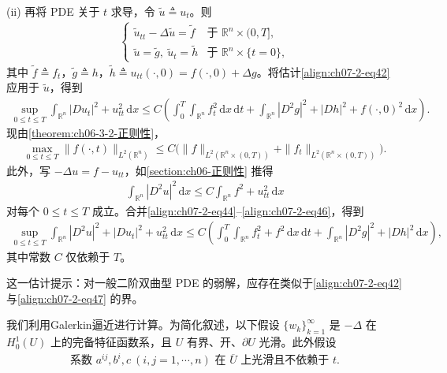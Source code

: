 \documentclass[../../main.tex]{subfiles}
\begin{document}
(ii) 再将 PDE 关于 $t$ 求导，令 $\widetilde{u}\triangleq u_t$。则
\begin{align}
\begin{cases}
\widetilde{u}_{tt}-\Delta\widetilde{u}=\widetilde{f} & \text{于 } \mathbb{R}^n\times(0,T],\\
\widetilde{u}=\widetilde{g},\ \widetilde{u}_t=\widetilde{h} & \text{于 } \mathbb{R}^n\times\{t=0\},
\end{cases}\label{align:ch07-2-eq43}
\end{align}
其中 $\widetilde{f}\triangleq f_t$，$\widetilde{g}\triangleq h$，$\widetilde{h}\triangleq u_{tt}(\cdot,0)=f(\cdot,0)+\Delta g$。将估计\eqref{align:ch07-2-eq42} 应用于 $\widetilde{u}$，得到
\begin{align}
\sup_{0\leqslant t\leqslant T}\int_{\mathbb{R}^n}|Du_t|^2+u_{tt}^2\,\mathrm{d}x
\leqslant C\left(\int_0^T\int_{\mathbb{R}^n}f_t^2\,\mathrm{d}x\,\mathrm{d}t+\int_{\mathbb{R}^n}|D^2g|^2+|Dh|^2+f(\cdot,0)^2\,\mathrm{d}x\right).\label{align:ch07-2-eq44}
\end{align}
现由\cref{theorem:ch06-3-2-正则性}，
\begin{align}
\max_{0\leqslant t\leqslant T}\|f(\cdot,t)\|_{L^2(\mathbb{R}^n)} \leqslant C\bigl(\|f\|_{L^2(\mathbb{R}^n\times(0,T))}+\|f_t\|_{L^2(\mathbb{R}^n\times(0,T))}\bigr).\label{align:ch07-2-eq45}
\end{align}
此外，写 $-\Delta u=f-u_{tt}$，如\cref{section:ch06-正则性} 推得
\begin{align}
\int_{\mathbb{R}^n}|D^2u|^2\,\mathrm{d}x \leqslant C\int_{\mathbb{R}^n}f^2+u_{tt}^2\,\mathrm{d}x\label{align:ch07-2-eq46}
\end{align}
对每个 $0\leqslant t\leqslant T$ 成立。合并\eqref{align:ch07-2-eq44}--\eqref{align:ch07-2-eq46}，得到
\begin{align}
\sup_{0\leqslant t\leqslant T}\int_{\mathbb{R}^n}|D^2u|^2+|Du_t|^2+u_{tt}^2\,\mathrm{d}x
\leqslant C\left(\int_0^T\int_{\mathbb{R}^n}f_t^2+f^2\,\mathrm{d}x\,\mathrm{d}t+\int_{\mathbb{R}^n}|D^2g|^2+|Dh|^2\,\mathrm{d}x\right),\label{align:ch07-2-eq47}
\end{align}
其中常数 $C$ 仅依赖于 $T$。

这一估计提示：对一般二阶双曲型 PDE 的弱解，应存在类似于\eqref{align:ch07-2-eq42} 与\eqref{align:ch07-2-eq47} 的界。

我们利用Galerkin逼近进行计算。为简化叙述，以下假设 $\{w_k\}_{k=1}^\infty$ 是 $-\Delta$ 在 $H^1_0(U)$ 上的完备特征函数系，且 $U$ 有界、开、$\partial U$ 光滑。此外假设
\begin{align}
\text{系数 } a^{ij},b^i,c\ (i,j=1,\cdots,n) \text{ 在 } \overline{U} \text{ 上光滑且不依赖于 } t.\label{align:ch07-2-eq48}
\end{align}
\end{document}
